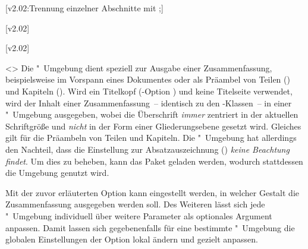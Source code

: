 \begin{DeclareEntity*}{}
\begin{DeclareEntity*}{}
\begin{DeclareEntity*}{}
\begin{Declaration}
  {}
  [v2.02:Trennung einzelner Abschnitte mit ;]
\begin{Declaration}
  {}
\begin{Declaration}
  {}
\begin{Declaration}
  {}
  [v2.02]
\begin{Declaration}
  {}
  [v2.02]
\begin{Declaration}
  {}
\begin{Declaration}
  {}
  <>
Die "~Umgebung dient speziell zur Ausgabe einer 
Zusammenfassung, beispielsweise im Vorspann eines Dokumentes oder als Präambel 
von Teilen () und Kapiteln (). 
Wird ein Titelkopf (\KOMAScript-Option ) und keine 
Titelseite verwendet, wird der Inhalt einer Zusammenfassung~-- identisch zu den 
\KOMAScript-Klassen~-- in einer "~Umgebung ausgegeben, 
wobei die Überschrift \emph{immer} zentriert in der aktuellen Schriftgröße und 
\emph{nicht} in der Form einer Gliederungsebene gesetzt wird. Gleiches gilt für 
die Präambeln von Teilen und Kapiteln. Die "~Umgebung 
hat allerdings den Nachteil, dass die Einstellung zur Absatzauszeichnung 
() \emph{keine Beachtung findet}. Um dies zu beheben, 
kann das Paket  geladen werden, wodurch stattdessen die 
Umgebung  genutzt wird.

Mit der zuvor erläuterten Option  kann eingestellt werden, in 
welcher Gestalt die Zusammenfassung ausgegeben werden soll. Des Weiteren lässt 
sich jede "~Umgebung individuell über weitere Parameter 
als optionales Argument anpassen. Damit lassen sich gegebenenfalls für eine 
bestimmte "~Umgebung die globalen Einstellungen 
der Option  lokal ändern und gezielt anpassen. 


\end{Declaration}
\end{Declaration}
\end{Declaration}
\end{Declaration}
\end{Declaration}
\end{Declaration}
\end{Declaration}
\end{DeclareEntity*}
\end{DeclareEntity*}
\end{DeclareEntity*}
